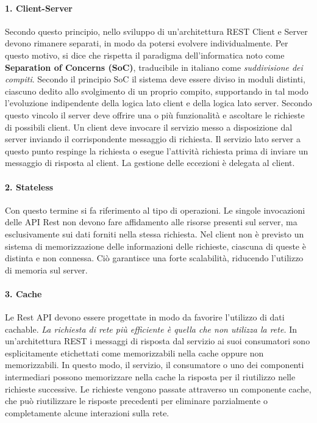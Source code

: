 \paragraph{1. Client-Server} Secondo questo principio, nello sviluppo di un'architettura REST Client e Server devono rimanere separati, in modo da potersi evolvere individualmente. Per questo motivo, si dice che rispetta il paradigma dell'informatica noto come \textbf{Separation of Concerns (SoC)}, traducibile in italiano come \emph{suddivisione dei compiti}. Secondo il principio SoC il sistema deve essere diviso in moduli distinti, ciascuno dedito allo svolgimento di un proprio compito, supportando in tal modo l’evoluzione indipendente della logica lato client e della logica lato server. Secondo questo vincolo il server deve offrire una o più funzionalità e ascoltare le richieste di possibili client. Un client deve invocare il servizio messo a disposizione dal server inviando il corrispondente messaggio di richiesta. Il servizio lato server a questo punto respinge la richiesta o esegue l’attività richiesta prima di inviare un messaggio di risposta al client. La gestione delle eccezioni è delegata al client.

\paragraph{2. Stateless} Con questo termine si fa riferimento al tipo di operazioni. Le singole invocazioni delle API Rest non devono fare affidamento alle risorse presenti sul server, ma esclusivamente sui dati forniti nella stessa richiesta. Nel client non è previsto un sistema di memorizzazione delle informazioni delle richieste, ciascuna di queste è distinta e non connessa. Ciò garantisce una forte scalabilità, riducendo l'utilizzo di memoria sul server.

\paragraph{3. Cache} Le Rest API devono essere progettate in modo da favorire l'utilizzo di dati cachable. \emph{La richiesta di rete più efficiente è quella che non utilizza la rete.} In un'architettura REST i messaggi di risposta dal servizio ai suoi consumatori sono esplicitamente etichettati come memorizzabili nella cache oppure non memorizzabili. In questo modo, il servizio, il consumatore o uno dei componenti intermediari possono memorizzare nella cache la risposta per il riutilizzo nelle richieste successive. Le richieste vengono passate attraverso un componente cache, che può riutilizzare le risposte precedenti per eliminare parzialmente o completamente alcune interazioni sulla rete.

